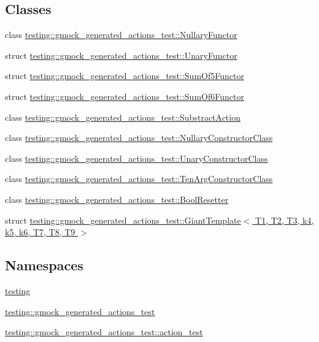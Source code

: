 \subsection*{Classes}
\begin{DoxyCompactItemize}
\item 
class \hyperlink{classtesting_1_1gmock__generated__actions__test_1_1_nullary_functor}{testing\+::gmock\+\_\+generated\+\_\+actions\+\_\+test\+::\+Nullary\+Functor}
\item 
struct \hyperlink{structtesting_1_1gmock__generated__actions__test_1_1_unary_functor}{testing\+::gmock\+\_\+generated\+\_\+actions\+\_\+test\+::\+Unary\+Functor}
\item 
struct \hyperlink{structtesting_1_1gmock__generated__actions__test_1_1_sum_of5_functor}{testing\+::gmock\+\_\+generated\+\_\+actions\+\_\+test\+::\+Sum\+Of5\+Functor}
\item 
struct \hyperlink{structtesting_1_1gmock__generated__actions__test_1_1_sum_of6_functor}{testing\+::gmock\+\_\+generated\+\_\+actions\+\_\+test\+::\+Sum\+Of6\+Functor}
\item 
class \hyperlink{classtesting_1_1gmock__generated__actions__test_1_1_substract_action}{testing\+::gmock\+\_\+generated\+\_\+actions\+\_\+test\+::\+Substract\+Action}
\item 
class \hyperlink{classtesting_1_1gmock__generated__actions__test_1_1_nullary_constructor_class}{testing\+::gmock\+\_\+generated\+\_\+actions\+\_\+test\+::\+Nullary\+Constructor\+Class}
\item 
class \hyperlink{classtesting_1_1gmock__generated__actions__test_1_1_unary_constructor_class}{testing\+::gmock\+\_\+generated\+\_\+actions\+\_\+test\+::\+Unary\+Constructor\+Class}
\item 
class \hyperlink{classtesting_1_1gmock__generated__actions__test_1_1_ten_arg_constructor_class}{testing\+::gmock\+\_\+generated\+\_\+actions\+\_\+test\+::\+Ten\+Arg\+Constructor\+Class}
\item 
class \hyperlink{classtesting_1_1gmock__generated__actions__test_1_1_bool_resetter}{testing\+::gmock\+\_\+generated\+\_\+actions\+\_\+test\+::\+Bool\+Resetter}
\item 
struct \hyperlink{structtesting_1_1gmock__generated__actions__test_1_1_giant_template}{testing\+::gmock\+\_\+generated\+\_\+actions\+\_\+test\+::\+Giant\+Template$<$ T1, T2, T3, k4, k5, k6, T7, T8, T9 $>$}
\end{DoxyCompactItemize}
\subsection*{Namespaces}
\begin{DoxyCompactItemize}
\item 
 \hyperlink{namespacetesting}{testing}
\item 
 \hyperlink{namespacetesting_1_1gmock__generated__actions__test}{testing\+::gmock\+\_\+generated\+\_\+actions\+\_\+test}
\item 
 \hyperlink{namespacetesting_1_1gmock__generated__actions__test_1_1action__test}{testing\+::gmock\+\_\+generated\+\_\+actions\+\_\+test\+::action\+\_\+test}
\end{DoxyCompactItemize}
